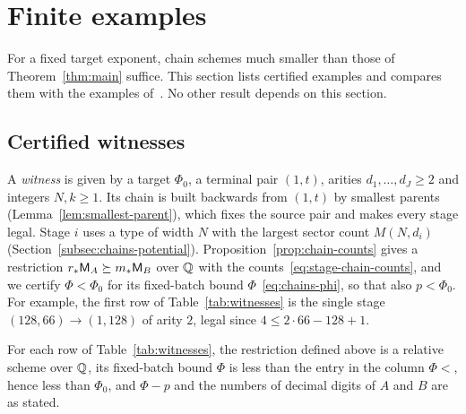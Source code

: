 \section{Finite examples}
\label{sec:examples}

For a fixed target exponent, chain schemes much smaller than those of
Theorem~\ref{thm:main} suffice. This section lists certified examples
and compares them with the examples of~\citep[Section~10]{FinCon26}. No
other result depends on this section.

\subsection{Certified witnesses}
\label{subsec:examples-witnesses}

A \emph{witness} is given by a target \(\Phi_0\), a terminal pair
\((1,t)\), arities \(d_1,\ldots,d_J\ge2\) and integers \(N,k\ge1\). Its
chain is built backwards from \((1,t)\) by smallest parents
(Lemma~\ref{lem:smallest-parent}), which fixes the source pair and makes
every stage legal. Stage \(i\) uses a type of width \(N\) with the
largest sector count \(M(N,d_i)\) (Section~\ref{subsec:chains-potential}).
Proposition~\ref{prop:chain-counts} gives a restriction
\(r_*\mathsf M_A\succeq m_*\mathsf M_B\) over \(\mathbb Q\) with the
counts~\eqref{eq:stage-chain-counts}, and we certify \(\Phi<\Phi_0\) for its
fixed-batch bound \(\Phi\)~\eqref{eq:chains-phi}, so that also
\(p<\Phi_0\). For example, the first row of Table~\ref{tab:witnesses}
is the single stage \((128,66)\to(1,128)\) of arity \(2\), legal since
\(4\le2\cdot66-128+1\).

\begin{proposition}[Witnesses]\label{prop:witnesses}
For each row of Table~\ref{tab:witnesses}, the restriction defined above
is a relative scheme over \(\mathbb Q\), its fixed-batch bound \(\Phi\) is less
than the entry in the column \(\Phi<\), hence less than \(\Phi_0\), and
\(\Phi-p\) and the numbers of decimal digits of \(A\) and \(B\) are as
stated.
\end{proposition}

